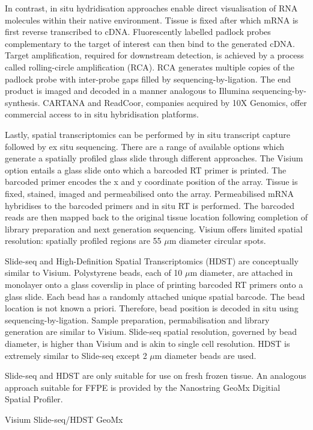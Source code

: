 In contrast, in situ hydridisation approaches enable direct visualisation of RNA molecules within their native environment. Tissue is fixed after which mRNA is first reverse transcribed to cDNA. 
Fluorescently labelled padlock probes complementary to the target of interest can then bind to the generated cDNA. Target amplification, required for downstream detection, is achieved by a process called rolling-circle amplification (RCA). RCA generates multiple copies of the padlock probe with inter-probe gaps filled by sequencing-by-ligation. The end product is imaged and decoded in a manner analogous to Illumina sequencing-by-synthesis. CARTANA and ReadCoor, companies acquired by 10X Genomics, offer commercial access to in situ hybridisation platforms.

Lastly, spatial transcriptomics can be performed by in situ transcript capture followed by ex situ sequencing. There are a range of available options which generate a spatially profiled glass slide through different approaches. The Visium option entails a glass slide onto which a barcoded RT primer is printed. The barcoded primer encodes the x and y coordinate position of the array. Tissue is fixed, stained, imaged and permeabilised onto the array. Permeabilised mRNA hybridises to the barcoded primers and in situ RT is performed. The barcoded reads are then mapped back to the original tissue location following completion of library preparation and next generation sequencing. Visium offers limited spatial resolution: spatially profiled regions are 55 $\mu$m diameter circular spots.

Slide-seq and High-Definition Spatial Transcriptomics (HDST) are conceptually similar to Visium. Polystyrene beads, each of 10 $\mu$m diameter, are attached in monolayer onto a glass coverslip in place of printing barcoded RT primers onto a glass slide. Each bead has a randomly attached unique spatial barcode. The bead location is not known a priori. Therefore, bead position is decoded in situ using sequencing-by-ligation. Sample preparation, permabilisation and library generation are similar to Visium. Slide-seq spatial resolution, governed by bead diameter, is higher than Visium and is akin to single cell resolution. HDST is extremely similar to Slide-seq except 2 $\mu$m diameter beads are used.

Slide-seq and HDST are only suitable for use on fresh frozen tissue. An analogous approach suitable for FFPE is provided by the Nanostring GeoMx Digitial Spatial Profiler.

Visium
Slide-seq/HDST
GeoMx

